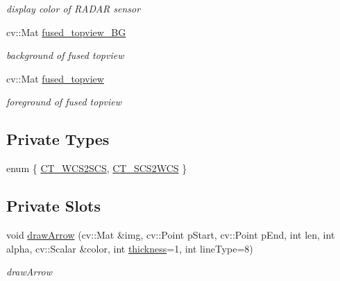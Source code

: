 \begin{DoxyCompactItemize}
\begin{DoxyCompactList}\small\item\em display color of R\+A\+D\+A\+R sensor \end{DoxyCompactList}\item 
\hypertarget{class_sensor_info_a23eb32e568652541c7aa6b32097f43b8}{}cv\+::\+Mat \hyperlink{class_sensor_info_a23eb32e568652541c7aa6b32097f43b8}{fused\+\_\+topview\+\_\+\+B\+G}\label{class_sensor_info_a23eb32e568652541c7aa6b32097f43b8}

\begin{DoxyCompactList}\small\item\em background of fused topview \end{DoxyCompactList}\item 
\hypertarget{class_sensor_info_a8862f0f8415919416a94165f31542222}{}cv\+::\+Mat \hyperlink{class_sensor_info_a8862f0f8415919416a94165f31542222}{fused\+\_\+topview}\label{class_sensor_info_a8862f0f8415919416a94165f31542222}

\begin{DoxyCompactList}\small\item\em foreground of fused topview \end{DoxyCompactList}\end{DoxyCompactItemize}
\subsection*{Private Types}
\begin{DoxyCompactItemize}
\item 
enum \{ \hyperlink{class_sensor_info_a1507edd91570cb8c0d44ccd944c41d4ba305da288a7f76e78e827842b7fb6a1ce}{C\+T\+\_\+\+W\+C\+S2\+S\+C\+S}, 
\hyperlink{class_sensor_info_a1507edd91570cb8c0d44ccd944c41d4ba14fc288aa74a572019a88d1596930454}{C\+T\+\_\+\+S\+C\+S2\+W\+C\+S}
 \}
\end{DoxyCompactItemize}
\subsection*{Private Slots}
\begin{DoxyCompactItemize}
\item 
void \hyperlink{class_sensor_info_af10798b424236b1ccb456a5a0b004d38}{draw\+Arrow} (cv\+::\+Mat \&img, cv\+::\+Point p\+Start, cv\+::\+Point p\+End, int len, int alpha, cv\+::\+Scalar \&color, int \hyperlink{class_sensor_info_a6219a61c1556e2acb5d9c0a9b32f6b02}{thickness}=1, int line\+Type=8)
\begin{DoxyCompactList}\small\item\em draw\+Arrow \end{DoxyCompactList}\end{DoxyCompactItemize}
